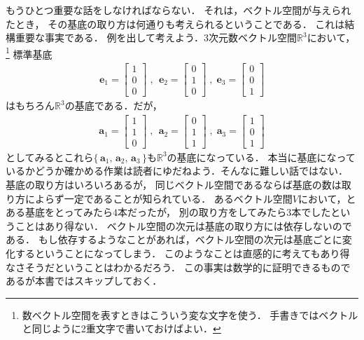 もうひとつ重要な話をしなければならない．
それは，ベクトル空間が与えられたとき，
その基底の取り方は何通りも考えられるということである．
これは結構重要な事実である．
例を出して考えよう．3次元数ベクトル空間$\mathbb{R}^3$において，
\footnote{数ベクトル空間を表すときはこういう変な文字を使う．
手書きではベクトルと同じように2重文字で書いておけばよい．}
標準基底
\begin{align*}
\bm{e}_1 = \left[
 \begin{array}{c}
  1 \\ 
  0 \\
  0
 \end{array}
\right]
\; , \, \; 
\bm{e}_2 = \left[
 \begin{array}{c}
  0 \\ 
  1 \\
  0
 \end{array}
\right]
\; , \; 
\bm{e}_3 = \left[
 \begin{array}{c}
 0 \\
 0 \\
 1
 \end{array}
\right]
\end{align*}
はもちろん$\mathbb{R}^3$の基底である．だが，
\begin{align*}
\bm{a}_1 = \left[
 \begin{array}{c}
  1 \\ 
  1 \\
  0
 \end{array}
\right]
\; , \, \; 
\bm{a}_2 = \left[
 \begin{array}{c}
  0 \\ 
  1 \\
  1
 \end{array}
\right]
\; , \; 
\bm{a}_3 = \left[
 \begin{array}{c}
 1 \\
 0 \\
 1
 \end{array}
\right]
\end{align*}
としてみるとこれら$ \{ \, \bm{a}_1, \, \bm{a}_2, \, \bm{a}_3 \, \} $も$\mathbb{R}^3$の基底になっている．
本当に基底になっているかどうか確かめる作業は読者にゆだねよう．そんなに難しい話ではない．
基底の取り方はいろいろあるが，
同じベクトル空間であるならば基底の数は取り方によらず一定であることが知られている．
あるベクトル空間$V$において，とある基底をとってみたら4本だったが，
別の取り方をしてみたら3本でしたということはあり得ない．
ベクトル空間の次元は基底の取り方には依存しないのである．
もし依存するようなことがあれば，ベクトル空間の次元は基底ごとに変化するということになってしまう．
このようなことは直感的に考えてもあり得なさそうだということはわかるだろう．
この事実は数学的に証明できるものであるが本書ではスキップしておく．

